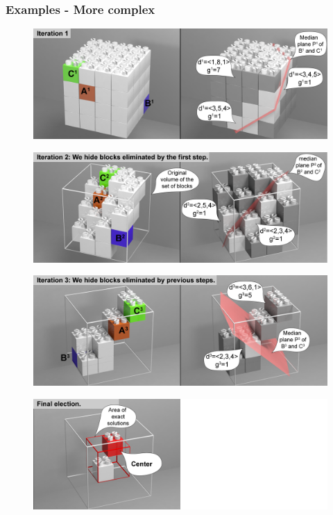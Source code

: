 \begin{frame} \frametitle{Examples - More complex}
\vspace{1cm}
\begin{center}
 {
	\begin{figure}
		\includegraphics[width=\linewidth]{fig/centrality/abc-centerv2/cube/step1}
	\end{figure}
}

 {
	\begin{figure}
		\centering
		\includegraphics[width=\linewidth]{fig/centrality/abc-centerv2/cube/step2}
	\end{figure}
}

 {
	\begin{figure}
	\includegraphics[width=\linewidth]{fig/centrality/abc-centerv2/cube/step3}
	\end{figure}
}

 {
	\begin{figure}
		\includegraphics[width=\linewidth]{fig/centrality/abc-centerv2/cube/step4}
	\end{figure}
}
\end{center}


\end{frame}

